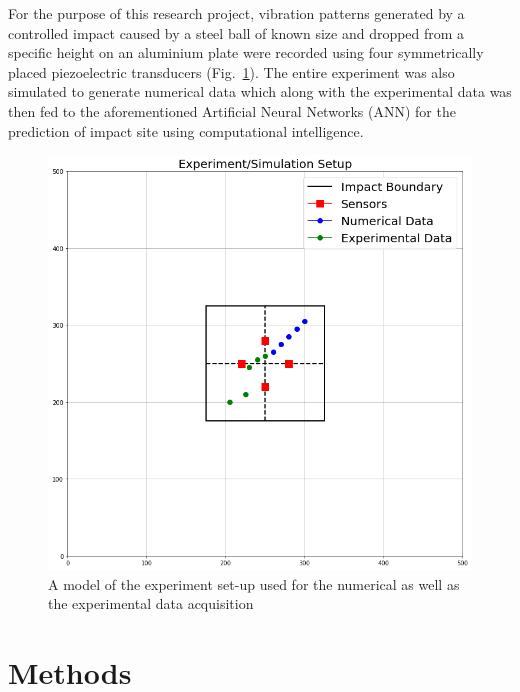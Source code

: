 \documentclass[12pt]{article}
\begin{document}
\par 
\noindent
For the purpose of this research project, vibration patterns generated by a controlled impact caused by a steel ball of known size and dropped from a specific height on an aluminium plate were recorded using four symmetrically placed piezoelectric transducers (Fig.~\ref{expSetup}). The entire experiment was also simulated to generate numerical data which along with the experimental data was then fed to the aforementioned Artificial Neural Networks (ANN) for the prediction of impact site using computational intelligence.  
\\
\begin{figure}[h!]
\begin{center}
\includegraphics[scale=0.4]{"Images/Experimental setup.png"}
\caption{A model of the experiment set-up used for the numerical as well as the experimental data acquisition}
\label{expSetup}
\end{center}
\end{figure}   

\section{Methods}
\end{document}
